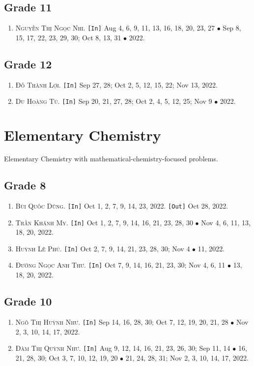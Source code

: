 \documentclass{article}
\numberwithin{equation}{section}
\begin{document}
\subsection{Grade 11}
\begin{enumerate}
	\item \textsc{Nguyễn Thị Ngọc Nhi.} \texttt{[In]} Aug 4, 6, 9, 11, 13, 16, 18, 20, 23, 27 $\bullet$ Sep 8, 15, 17, 22, 23, 29, 30; Oct 8, 13, 31 $\bullet$ 2022.
\end{enumerate}

\subsection{Grade 12}
\begin{enumerate}
	\item \textsc{Đỗ Thành Lợi.} \texttt{[In]} Sep 27, 28; Oct 2, 5, 12, 15, 22; Nov 13, 2022.
	\item \textsc{Du Hoàng Tú.} \texttt{[In]} Sep 20, 21, 27, 28; Oct 2, 4, 5, 12, 25; Nov 9 $\bullet$ 2022.
\end{enumerate}


\section{Elementary Chemistry}
Elementary Chemistry with mathematical-chemistry-focused problems.

\subsection{Grade 8}
\begin{enumerate}
	\item \textsc{Bùi Quốc Dũng.} \texttt{[In]} Oct 1, 2, 7, 9, 14, 23, 2022. \texttt{[Out]} Oct 28, 2022.
	\item \textsc{Trần Khánh My.} \texttt{[In]} Oct 1, 2, 7, 9, 14, 16, 21, 23, 28, 30 $\bullet$ Nov 4, 6, 11, 13, 18, 20, 2022.
	\item \textsc{Huỳnh Lê Phú.} \texttt{[In]} Oct 2, 7, 9, 14, 21, 23, 28, 30; Nov 4 $\bullet$ 11, 2022.
	\item \textsc{Đường Ngọc Anh Thư.} \texttt{[In]} Oct 7, 9, 14, 16, 21, 23, 30; Nov 4, 6, 11 $\bullet$ 13, 18, 20, 2022.
\end{enumerate}

\subsection{Grade 10}
\begin{enumerate}
	\item \textsc{Ngô Thị Huỳnh Như.} \texttt{[In]} Sep 14, 16, 28, 30; Oct 7, 12, 19, 20, 21, 28 $\bullet$ Nov 2, 3, 10, 14, 17, 2022.
	\item \textsc{Đàm Thị Quỳnh Như.} \texttt{[In]} Aug 9, 12, 14, 16, 21, 23, 26, 30; Sep 11, 14 $\bullet$ 16, 21, 28, 30; Oct 3, 7, 10, 12, 19, 20 $\bullet$ 21, 24, 28, 31; Nov 2, 3, 10, 14, 17, 2022.
\end{enumerate}
\end{document}
